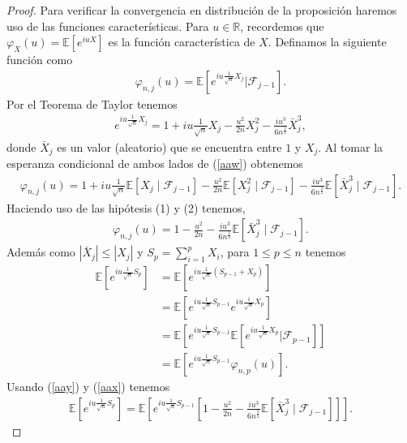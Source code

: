 \begin{proof}
Para verificar la convergencia en distribución de la proposición haremos uso de las funciones características. Para $u \in \mathbb{R}$, recordemos que $\varphi_X (u) = \mathbb{E}[e^{iuX}]$ es la función característica de $X$. Definamos la siguiente función  como
	\begin{align*}
	\varphi_{n, j} (u) = \mathbb{E}\left[e^{iu \frac{1}{\sqrt{n}} X_j} \bigg| \mathcal{F}_{j-1}\right].
	\end{align*}
Por el Teorema de Taylor \cite[p.~358]{apostol} tenemos
	\begin{align}
	e^{iu \frac{1}{\sqrt{n}} X_j} = 1 + iu \frac{1}{\sqrt{n}} X_j - \frac{u^2}{2n} X_j^2 - \frac{iu^3}{6n^{\frac{3}{2}}} \bar{X}_j^3, \label{aaw}
	\end{align}
donde $\bar{X}_j$ es un valor (aleatorio) que se encuentra entre $1$ y $X_j$. Al tomar la esperanza condicional de ambos lados de (\ref{aaw}) obtenemos
	\begin{align*}
	\varphi_{n, j} (u) = 1 + iu \frac{1}{\sqrt{n}} \mathbb{E}[X_j \mid \mathcal{F}_{j-1}] - \frac{u^2}{2n} \mathbb{E}[X_j^2 \mid \mathcal{F}_{j-1}] - \frac{iu^3}{6n^{\frac{3}{2}}} \mathbb{E}[\bar{X}_j^3 \mid \mathcal{F}_{j-1}].
	\end{align*}
Haciendo uso de las hipótesis (1) y (2) tenemos,
	\begin{align}
	\varphi_{n, j} (u) = 1 - \frac{u^2}{2n} - \frac{iu^3}{6n^{\frac{3}{2}}} \mathbb{E}[\bar{X}_j^3 \mid \mathcal{F}_{j-1}]. \label{aax}
	\end{align}
Además como $|\bar{X}_j| \leq |X_j|$ y $S_p = \sum_{i=1}^p X_i$, para $1 \leq p \leq n$ tenemos
	\begin{align}
	\mathbb{E}\left[e^{iu \frac{1}{\sqrt{n}} S_p} \right] & = \mathbb{E}\left[e^{iu \frac{1}{\sqrt{n}} (S_{p-1} + X_p) } \right] \label{aay} \\
	& = \mathbb{E}\left[e^{iu \frac{1}{\sqrt{n}} S_{p-1}} e^{iu \frac{1}{\sqrt{n}} X_p} \right] \nonumber \\ 
	& = \mathbb{E}\left[e^{iu \frac{1}{\sqrt{n}} S_{p-1}} \mathbb{E}\left[e^{iu \frac{1}{\sqrt{n}} X_p} \bigg| \mathcal{F}_{p-1} \right]\right] \nonumber \\ 
	& = \mathbb{E}\left[e^{iu \frac{1}{\sqrt{n}} S_{p-1}} \varphi_{n, p} (u) \right] \nonumber.
	\end{align}
Usando (\ref{aay}) y (\ref{aax}) tenemos
	\begin{align*}
	\mathbb{E}\left[e^{iu \frac{1}{\sqrt{n}} S_p} \right] = \mathbb{E}\left[e^{iu \frac{1}{\sqrt{n}} S_{p-1}} \left[ 1 - \frac{u^2}{2n} - \frac{iu^3}{6n^{\frac{3}{2}}} \mathbb{E}[\bar{X}_j^3 \mid \mathcal{F}_{j-1}] \right]\right].

\end{align*}
\end{proof}
